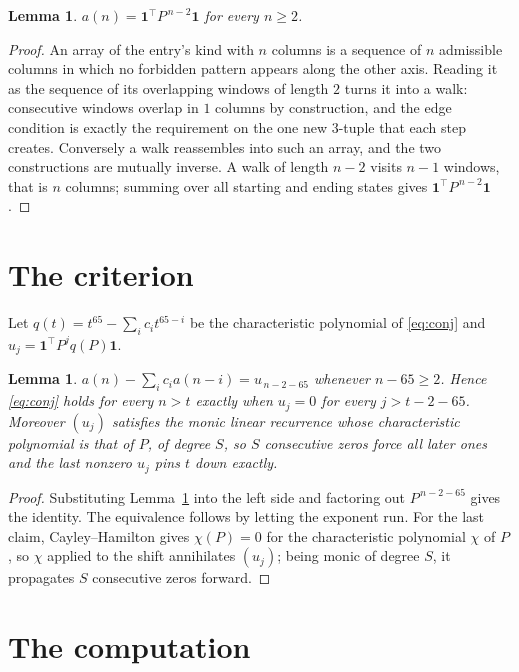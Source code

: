 \documentclass[11pt,a4paper]{article}
\theoremstyle{plain}
\newtheorem{lemma}[theorem]{Lemma}
\theoremstyle{definition}
\begin{document}
\begin{lemma}\label{lem:walk}
$a(n)=\mathbf{1}^{\!\top}P^{\,n-2}\mathbf{1}$ for every $n\ge2$.
\end{lemma}

\begin{proof}
An array of the entry's kind with $n$ columns is a sequence of $n$ admissible columns in
which no forbidden pattern appears along the other axis. Reading it as the sequence of its
overlapping windows of length $2$ turns it into a walk: consecutive windows overlap in
$1$ columns by construction, and the edge condition is exactly the requirement on the one
new $3$-tuple that each step creates. Conversely a walk reassembles into such an array,
and the two constructions are mutually inverse. A walk of length $n-2$ visits $n-1$
windows, that is $n$ columns; summing over all starting and ending states gives
$\mathbf{1}^{\!\top}P^{\,n-2}\mathbf{1}$.
\end{proof}

\section{The criterion}

Let $q(t)=t^{65}-\sum_i c_i t^{65-i}$ be the characteristic polynomial of
\eqref{eq:conj} and $u_j=\mathbf{1}^{\!\top}P^{j}q(P)\mathbf{1}$.

\begin{lemma}\label{lem:crit}
$a(n)-\sum_i c_i a(n-i)=u_{\,n-2-65}$ whenever $n-65\ge2$. Hence
\eqref{eq:conj} holds for every $n>t$ exactly when $u_j=0$ for every
$j>t-2-65$. Moreover $(u_j)$ satisfies the monic linear recurrence whose
characteristic polynomial is that of $P$, of degree $S$, so $S$ consecutive zeros force all
later ones and the last nonzero $u_j$ pins $t$ down exactly.
\end{lemma}

\begin{proof}
Substituting Lemma~\ref{lem:walk} into the left side and factoring out
$P^{\,n-2-65}$ gives the identity. The equivalence follows by letting the exponent
run. For the last claim, Cayley--Hamilton gives $\chi(P)=0$ for the characteristic
polynomial $\chi$ of $P$, so $\chi$ applied to the shift annihilates $(u_j)$; being monic of
degree $S$, it propagates $S$ consecutive zeros forward.
\end{proof}

\section{The computation}
\end{document}
